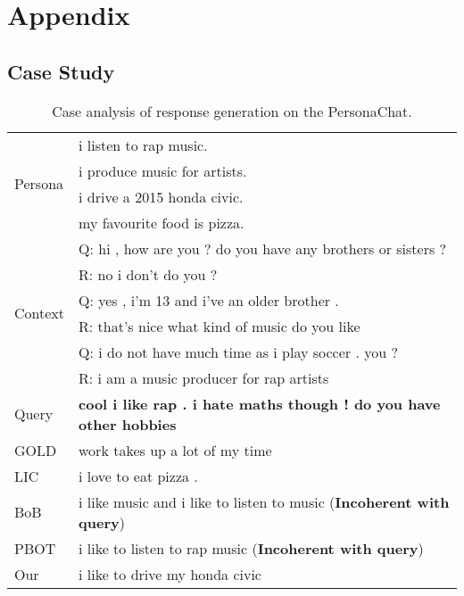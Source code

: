 \documentclass[letterpaper]{article} \usepackage{aaai23}  \usepackage{times}  \usepackage{helvet}  \usepackage{courier}  \usepackage[hyphens]{url}  \usepackage{graphicx} \urlstyle{rm} \def\UrlFont{\rm}  \usepackage{natbib}  \usepackage{caption} \frenchspacing  \setlength{\pdfpagewidth}{8.5in}  \setlength{\pdfpageheight}{11in}  \usepackage{algorithm}
\begin{document}

\appendix
\section{Appendix}
\subsection{Case Study}
\begin{table*}[ht]
  \centering
    \begin{tabular}{ll}
    \toprule
    \multirow{4}{*}{Persona} & i listen to rap music. \\
    ~& i produce music for artists. \\
    ~& i drive a 2015 honda civic. \\
    ~& my favourite food is pizza. \\
    \midrule
    \multirow{6}{*}{Context} & Q: hi , how are you ? do you have any brothers or sisters ? \\
    ~& R: no i don't do you ? \\
    ~& Q: yes , i'm 13 and i've an older brother . \\
    ~& R: that's nice what kind of music do you like \\
    ~& Q: i do not have much time as i play soccer . you ? \\
    ~& R: i am a music producer for rap artists \\
   \bottomrule
\toprule    Query & \textbf{cool i like rap . i hate maths though ! do you have other hobbies} \\
\midrule   GOLD  & work takes up a lot of my time \\
\midrule  LIC   & i love to eat pizza . \\
\midrule   BoB   &  i like music and i like to listen to music (\textbf{Incoherent with query})\\
\midrule    PBOT & i like to listen to rap music (\textbf{Incoherent with query})\\
\midrule    Our   & i like to drive my honda civic \\
\bottomrule    \end{tabular}\caption{Case analysis of response generation on the PersonaChat.}
\label{table8}\end{table*}
\end{document}
